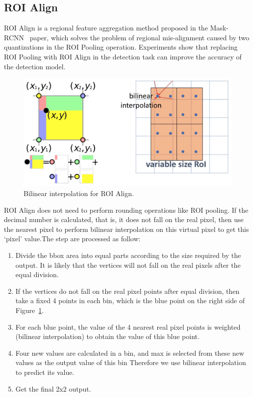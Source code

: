 \label{sec:roialign}
\subsection{ROI Align}
ROI Align is a regional feature aggregation method proposed in the Mask-RCNN~\cite{he2018mask} paper, which solves the problem of regional mis-alignment caused by two quantizations in the ROI Pooling operation. Experiments show that replacing ROI Pooling with ROI Align in the detection task can improve the accuracy of the detection model.

\begin{figure}[!htbp]
	\centering
	\includegraphics[width=1\linewidth]{figures/roi_align}
	\caption[Bilinear interpolation for ROI Align]{Bilinear interpolation for ROI Align.}
	\label{fig:roialign}
\end{figure}

ROI Align does not need to perform rounding operations like ROI pooling. If the decimal number is calculated, that is, it does not fall on the real pixel, then use the nearest pixel to perform bilinear interpolation on this virtual pixel to get this `pixel'  value.The step are processed as follow:

\begin{enumerate}[1.]
	\item Divide the bbox area into equal parts according to the size required by the output. It is likely that the vertices will not fall on the real pixels after the equal division.
	\item If the vertices do not fall on the real pixel points after equal division, then take a fixed 4 points in each bin, which is the blue point on the right side of Figure~\ref{fig:roialign}.
	\item For each blue point, the value of the 4 nearest real pixel points is weighted (bilinear interpolation) to obtain the value of this blue point.
	\item  Four new values are calculated in a bin, and max is selected from these new values as the output value of this bin Therefore we use bilinear interpolation to predict its value.
	\item Get the final 2x2 output.
\end{enumerate}

